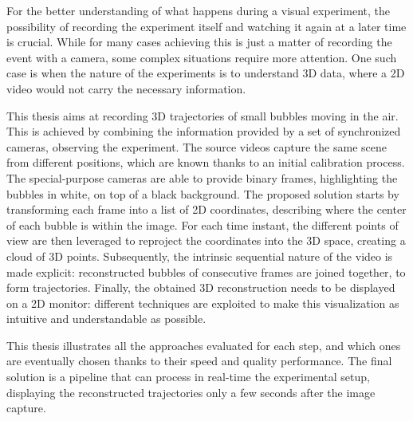 
For the better understanding of what happens during a visual experiment, the possibility of recording the experiment itself and watching it again at a later time is crucial.
While for many cases achieving this is just a matter of recording the event with a camera, some complex situations require more attention.
One such case is when the nature of the experiments is to understand 3D data, where a 2D video would not carry the necessary information.

This thesis aims at recording 3D trajectories of small bubbles moving in the air.
This is achieved by combining the information provided by a set of synchronized cameras, observing the experiment.
The source videos capture the same scene from different positions, which are known thanks to an initial calibration process.
The special-purpose cameras are able to provide binary frames, highlighting the bubbles in white, on top of a black background.
The proposed solution starts by transforming each frame into a list of 2D coordinates, describing where the center of each bubble is within the image.
For each time instant, the different points of view are then leveraged to reproject the coordinates into the 3D space, creating a cloud of 3D points.
Subsequently, the intrinsic sequential nature of the video is made explicit: reconstructed bubbles of consecutive frames are joined together, to form trajectories.
Finally, the obtained 3D reconstruction needs to be displayed on a 2D monitor: different techniques are exploited to make this visualization as intuitive and understandable as possible.

This thesis illustrates all the approaches evaluated for each step, and which ones are eventually chosen thanks to their speed and quality performance.
The final solution is a pipeline that can process in real-time the experimental setup, displaying the reconstructed trajectories only a few seconds after the image capture.
